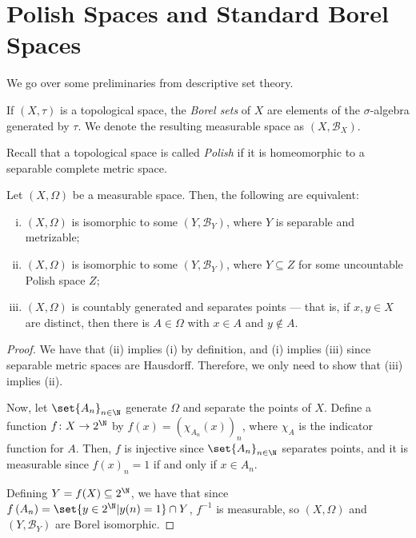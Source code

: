 \documentclass[10pt]{mypackage}
\begin{document}
\RaggedRight
\section{Polish Spaces and Standard Borel Spaces}%
We go over some preliminaries from descriptive set theory.
\begin{definition}
  If $\left( X,\tau \right)$ is a topological space, the \textit{Borel sets} of $X$ are elements of the $\sigma$-algebra generated by $\tau$. We denote the resulting measurable space as $\left( X,\mathcal{B}_X \right)$.
\end{definition}
Recall that a topological space is called \textit{Polish} if it is homeomorphic to a separable complete metric space.
\begin{proposition}
  Let $\left( X,\Omega \right)$ be a measurable space. Then, the following are equivalent:
  \begin{enumerate}[(i)]
    \item $\left( X,\Omega \right)$ is isomorphic to some $\left( Y,\mathcal{B}_Y \right)$, where $Y$ is separable and metrizable;
    \item $\left( X,\Omega \right)$ is isomorphic to some $\left( Y,\mathcal{B}_Y \right)$, where $Y\subseteq Z$ for some uncountable Polish space $Z$;
    \item $\left( X,\Omega \right)$ is countably generated and separates points --- that is, if $x,y\in X$ are distinct, then there is $A\in \Omega$ with $x\in A$ and $y\notin A$.
  \end{enumerate}
\end{proposition}
\begin{proof}
  We have that (ii) implies (i) by definition, and (i) implies (iii) since separable metric spaces are Hausdorff. Therefore, we only need to show that (iii) implies (ii).

  Now, let $\set{A_n}_{n\in \N}$ generate $\Omega$ and separate the points of $X$. Define a function $f\colon X\rightarrow 2^{\N}$ by $f(x) = \left( \chi_{A_n}(x) \right)_{n}$, where $\chi_A$ is the indicator function for $A$. Then, $f$ is injective since $\set{A_n}_{n\in \N}$ separates points, and it is measurable since $f(x)_n = 1$ if and only if $x\in A_n$.

  Defining $Y = f(X)\subseteq 2^{\N}$, we have that since $f\left( A_n \right) = \set{y\in 2^{\N} | y(n) = 1}\cap Y$, $f^{-1}$ is measurable, so $\left( X,\Omega \right)$ and $\left( Y,\mathcal{B}_Y \right)$ are Borel isomorphic.
\end{proof}
\end{document}
